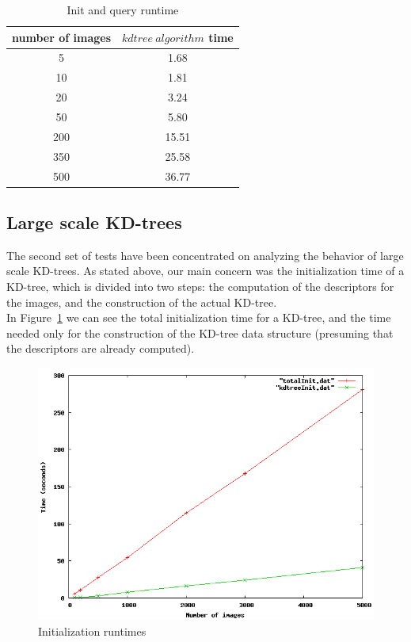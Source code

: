 \begin{table}
\centering
\begin{tabular} {c | c }
	number of images & $kdtree\ algorithm$ time \\
	\hline
	5 & 1.68 \\
	10 & 1.81 \\
	20 & 3.24 \\
	50 & 5.80 \\
	200 & 15.51 \\
	350 & 25.58 \\
	500 & 36.77 \\
\end{tabular}
\caption{Init and query runtime}
\end{table}



\subsection{Large scale KD-trees}

The second set of tests have been concentrated on analyzing the behavior of large scale KD-trees.
As stated above, our main concern was the initialization time of a KD-tree, which is divided into two steps: the computation of the descriptors for the images, and the construction of the actual KD-tree.\\
In Figure~\ref{fig:totalInit} we can see the total initialization time for a KD-tree, and the time needed only for the construction of the KD-tree data structure (presuming that the descriptors are already computed). \\
\begin{figure}[ht!]
\centering
\includegraphics[width=.8\linewidth]{images/totalInit.png}
\caption{Initialization runtimes}
\label{fig:totalInit}
\end{figure}


